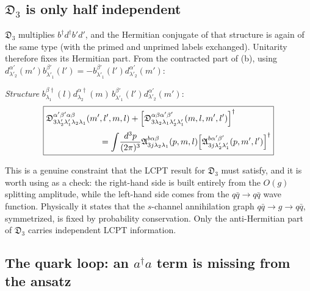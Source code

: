 \documentclass[11pt]{article}
\newcommand{\mf}{\mathfrak}
\newcommand{\dg}{\dagger}
\newcommand{\ip}[1]{\int\!\frac{d^{3}#1}{(2\pi)^{3}}}
\begin{document}
\subsection{$\mf D_{3}$ is only half independent}

$\mf D_{3}$ multiplies $b^{\dg}d^{\dg}b'd'$, and the Hermitian conjugate of that structure is
again of the same type (with the primed and unprimed labels exchanged). Unitarity therefore fixes
its Hermitian part. From the contracted part of (b), using
$d^{\alpha'}_{\lambda'_{2}}(m')b^{\beta'}_{\lambda'_{1}}(l')
=-b^{\beta'}_{\lambda'_{1}}(l')d^{\alpha'}_{\lambda'_{2}}(m')$:

\begin{res}
\emph{Structure} $b^{\beta\dg}_{\lambda_{1}}(l)d^{\alpha\dg}_{\lambda_{2}}(m)\,
b^{\beta'}_{\lambda'_{1}}(l')d^{\alpha'}_{\lambda'_{2}}(m')$:
\begin{align}
\boxed{
\begin{aligned}
&\mf D^{\alpha'\beta'\alpha\beta}_{3\lambda'_{2}\lambda'_{1}\lambda_{2}\lambda_{1}}(m',l',m,l)
+\Big[\mf D^{\alpha\beta\alpha'\beta'}_{3\lambda_{2}\lambda_{1}\lambda'_{2}\lambda'_{1}}(m,l,m',l')\Big]^{\dg}
\\[2pt]
&\hspace{2.2cm}
=\ip{p}\mf A^{b\alpha\beta}_{3j\lambda_{2}\lambda_{1}}(p,m,l)
\Big[\mf A^{b\alpha'\beta'}_{3j\lambda'_{2}\lambda'_{1}}(p,m',l')\Big]^{\dg}
\end{aligned}}
\label{eq:D3}
\end{align}
\end{res}

\noindent
This is a genuine constraint that the LCPT result for $\mf D_{3}$ must satisfy, and it is worth
using as a check: the right-hand side is built entirely from the $O(g)$ splitting amplitude, while
the left-hand side comes from the $q\bar q\to q\bar q$ wave function. Physically it states that
the $s$-channel annihilation graph $q\bar q\to g\to q\bar q$, symmetrized, is fixed by
probability conservation. Only the anti-Hermitian part of $\mf D_{3}$ carries independent LCPT
information.

\subsection{The quark loop: an $a^{\dg}a$ term is missing from the ansatz}
\end{document}
